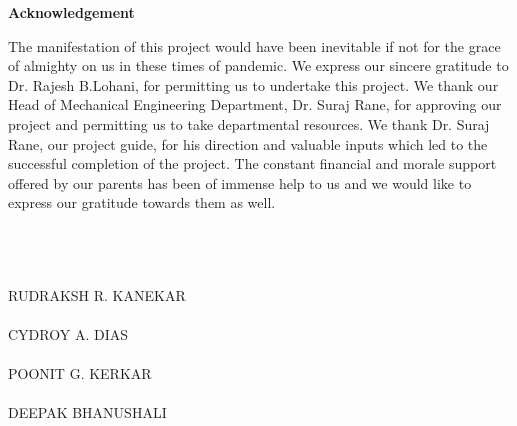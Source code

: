 \begin{center}
\begin{huge}
\bfseries{Acknowledgement}\\
\end{huge}
\end{center}
\vspace{1cm}
The manifestation of this project would have been inevitable if not for the grace of almighty on us in these times of pandemic. We express our sincere gratitude to Dr. Rajesh B.Lohani, for permitting us to undertake this project. We thank our Head of Mechanical Engineering Department, Dr. Suraj Rane, for approving our project and permitting us to take departmental resources. We thank Dr. Suraj Rane, our project guide, for his direction and valuable inputs which led to the successful completion of the project. The constant financial and morale support offered by our parents has been of immense help to us and we would like to express our gratitude towards them as well.

\noindent \\
\noindent \\
\noindent \\
RUDRAKSH R. KANEKAR\\
\noindent \\
CYDROY A. DIAS\\
\noindent \\
POONIT G. KERKAR\\
\noindent \\
DEEPAK BHANUSHALI